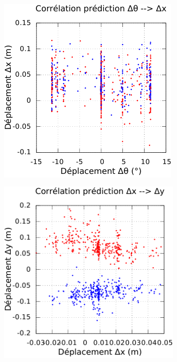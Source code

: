 \begin{figure}[htbp]
\begin{subfigure}{0.22\paperwidth}
    \end{subfigure}
    \begin{subfigure}{0.22\paperwidth}
        \centering
        \includegraphics[type=pdf,ext=.pdf,read=.pdf,width=1.0\linewidth]{../plot/OdometryLWPR/grass_close_function_goal_yaw_x}
    \end{subfigure}
    \vspace{0.2cm}
    \newline
    \begin{subfigure}{0.22\paperwidth}
        \centering
        \includegraphics[type=pdf,ext=.pdf,read=.pdf,width=1.0\linewidth]{../plot/OdometryLWPR/grass_close_function_goal_x_y}

\end{subfigure}
\end{figure}
